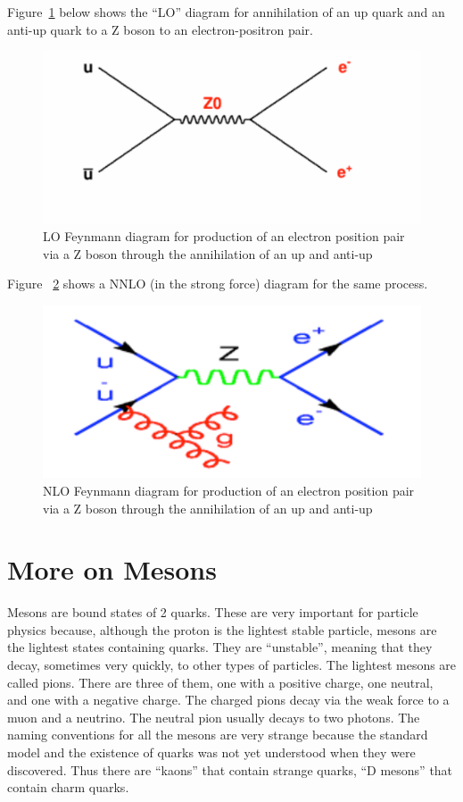 Figure~\ref{fig:fig8} below shows the “LO” diagram for annihilation of an up quark and an anti-up quark to a Z boson to an electron-positron pair.


\begin{figure}[h]
\centering\includegraphics[scale=0.5]{./ElementaryParticles/Pictures/fig8.pdf}
\caption{LO Feynmann diagram for production of an electron position pair via a Z boson through the annihilation of an up and anti-up}
\label{fig:fig8}
\end{figure}
 

Figure ~\ref{fig:fig9} shows a NNLO (in the strong force) diagram for the same process.
 
\begin{figure}[h]
\centering\includegraphics[scale=0.5]{./ElementaryParticles/Pictures/fig9.pdf}
\caption{NLO Feynmann diagram for production of an electron position pair via a Z boson through the annihilation of an up and anti-up}
\label{fig:fig9}
\end{figure}


\section{More on Mesons}
Mesons are bound states of 2 quarks.  These are very important for particle physics because, although the proton is the lightest stable particle, mesons are the lightest states containing quarks.  They are “unstable”, meaning that they decay, sometimes very quickly, to other types of particles.
The lightest mesons are called pions.  There are three of them, one with a positive charge, one neutral, and one with a negative charge.  The charged pions decay via the weak force to a muon and a neutrino.  The neutral pion usually decays to two photons.
The naming conventions for all the mesons are very strange because the standard model and the existence of quarks was not yet understood when they were discovered.  Thus there are “kaons” that contain strange quarks, “D mesons” that contain charm quarks.

